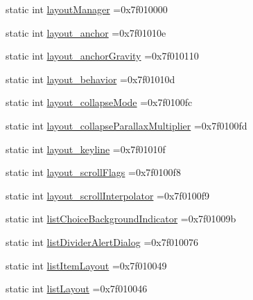 \begin{DoxyCompactItemize}
\item 
static int \hyperlink{classandroid_1_1support_1_1v7_1_1appcompat_1_1R_1_1attr_a6e635fa75682ab7dee989c2d98624c99}{layout\+Manager} =0x7f010000
\item 
static int \hyperlink{classandroid_1_1support_1_1v7_1_1appcompat_1_1R_1_1attr_a394f8b20bd8121817fc5d993a0236314}{layout\+\_\+anchor} =0x7f01010e
\item 
static int \hyperlink{classandroid_1_1support_1_1v7_1_1appcompat_1_1R_1_1attr_a7746918fec5990cb35abc69535991375}{layout\+\_\+anchor\+Gravity} =0x7f010110
\item 
static int \hyperlink{classandroid_1_1support_1_1v7_1_1appcompat_1_1R_1_1attr_a00932b370ca0c3682e18c8d9ab07da5b}{layout\+\_\+behavior} =0x7f01010d
\item 
static int \hyperlink{classandroid_1_1support_1_1v7_1_1appcompat_1_1R_1_1attr_aa20fa9883f29d3efd81f079d8a773820}{layout\+\_\+collapse\+Mode} =0x7f0100fc
\item 
static int \hyperlink{classandroid_1_1support_1_1v7_1_1appcompat_1_1R_1_1attr_a36de735fcffce1fbe2484a4b33986e9e}{layout\+\_\+collapse\+Parallax\+Multiplier} =0x7f0100fd
\item 
static int \hyperlink{classandroid_1_1support_1_1v7_1_1appcompat_1_1R_1_1attr_a400f335d8e2223bed92f8a00fc97534f}{layout\+\_\+keyline} =0x7f01010f
\item 
static int \hyperlink{classandroid_1_1support_1_1v7_1_1appcompat_1_1R_1_1attr_aa36aa8886bb09115b0225a3bd05e253d}{layout\+\_\+scroll\+Flags} =0x7f0100f8
\item 
static int \hyperlink{classandroid_1_1support_1_1v7_1_1appcompat_1_1R_1_1attr_a0fd25d0e2274f4f31f8c486cb199e915}{layout\+\_\+scroll\+Interpolator} =0x7f0100f9
\item 
static int \hyperlink{classandroid_1_1support_1_1v7_1_1appcompat_1_1R_1_1attr_a8478bb010748f1d9c25576387050c212}{list\+Choice\+Background\+Indicator} =0x7f01009b
\item 
static int \hyperlink{classandroid_1_1support_1_1v7_1_1appcompat_1_1R_1_1attr_a74f718ff27616bea80007993e0549993}{list\+Divider\+Alert\+Dialog} =0x7f010076
\item 
static int \hyperlink{classandroid_1_1support_1_1v7_1_1appcompat_1_1R_1_1attr_aac806ba62d695aec18eee470353341ac}{list\+Item\+Layout} =0x7f010049
\item 
static int \hyperlink{classandroid_1_1support_1_1v7_1_1appcompat_1_1R_1_1attr_a39adb57b26d0e68eee700d832de9946a}{list\+Layout} =0x7f010046
\item 

\end{DoxyCompactItemize}
